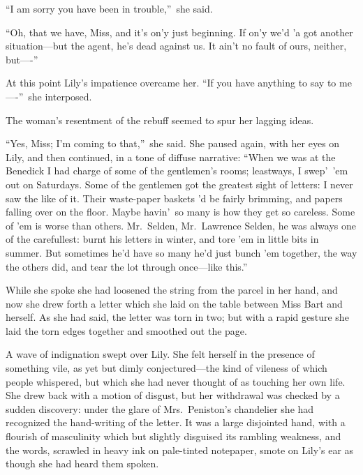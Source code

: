 \documentclass[12pt,a4paper]{book}
\begin{document}
``I am sorry you have been in trouble,''\ she said.





``Oh, that we have, Miss, and it's on'y just beginning. If on'y
we'd 'a got another situation---but the agent, he's dead against
us. It ain't no fault of ours, neither, but----''





At this point Lily's impatience overcame her. ``If you have
anything to say to me----''\ she interposed.





The woman's resentment of the rebuff seemed to spur her lagging ideas.





``Yes, Miss; I'm coming to that,''\ she said. She paused again, with
her eyes on Lily, and then continued, in a tone of diffuse
narrative: ``When we was at the Benedick I had charge of some of
the gentlemen's rooms; leastways, I swep'\ 'em out on Saturdays. 
Some of the gentlemen got the greatest sight of letters: I never
saw the like of it. Their waste-paper baskets 'd be fairly
brimming, and papers falling over on the floor. Maybe havin'\ so
many is how they get so careless. Some of 'em is worse than
others. Mr.\ Selden, Mr.\ Lawrence Selden, he was always one of the
carefullest: burnt his letters in winter, and tore 'em in little
bits in summer. But sometimes he'd have so many he'd just bunch
'em together, the way the others did, and tear the lot through
once---like this.''





While she spoke she had loosened the string from the parcel in
her hand, and now she drew forth a letter which she laid on the
table between Miss Bart and herself. As she had said, the letter
was torn in two; but with a rapid gesture she laid the torn edges
together and smoothed out the page.





A wave of indignation swept over Lily. She felt herself in the
presence of something vile, as yet but dimly conjectured---the
kind of vileness of which people whispered, but which she had
never thought of as touching her own life. She drew back with a
motion of disgust, but her withdrawal was checked by a sudden
discovery: under the glare of Mrs.\ Peniston's chandelier she had
recognized the hand-writing of the letter. It was a large
disjointed hand, with a flourish of masculinity which but
slightly disguised its rambling weakness, and the words, scrawled
in heavy ink on pale-tinted notepaper, smote on Lily's
ear as though she had heard them spoken.
\end{document}
